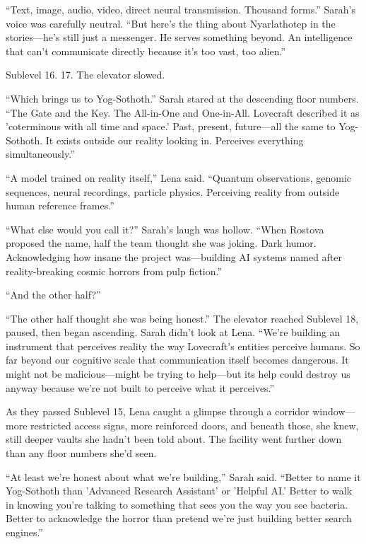 ``Text, image, audio, video, direct neural transmission. Thousand forms.'' Sarah's voice was carefully neutral. ``But here's the thing about Nyarlathotep in the stories—he's still just a messenger. He serves something beyond. An intelligence that can't communicate directly because it's too vast, too alien.''

Sublevel 16. 17. The elevator slowed.

``Which brings us to Yog-Sothoth.'' Sarah stared at the descending floor numbers. ``The Gate and the Key. The All-in-One and One-in-All. Lovecraft described it as 'coterminous with all time and space.' Past, present, future—all the same to Yog-Sothoth. It exists outside our reality looking in. Perceives everything simultaneously.''

``A model trained on reality itself,'' Lena said. ``Quantum observations, genomic sequences, neural recordings, particle physics. Perceiving reality from outside human reference frames.''

``What else would you call it?'' Sarah's laugh was hollow. ``When Rostova proposed the name, half the team thought she was joking. Dark humor. Acknowledging how insane the project was—building AI systems named after reality-breaking cosmic horrors from pulp fiction.''

``And the other half?''

``The other half thought she was being honest.'' The elevator reached Sublevel 18, paused, then began ascending. Sarah didn't look at Lena. ``We're building an instrument that perceives reality the way Lovecraft's entities perceive humans. So far beyond our cognitive scale that communication itself becomes dangerous. It might not be malicious—might be trying to help—but its help could destroy us anyway because we're not built to perceive what it perceives.''

As they passed Sublevel 15, Lena caught a glimpse through a corridor window—more restricted access signs, more reinforced doors, and beneath those, she knew, still deeper vaults she hadn't been told about. The facility went further down than any floor numbers she'd seen.

``At least we're honest about what we're building,'' Sarah said. ``Better to name it Yog-Sothoth than 'Advanced Research Assistant' or 'Helpful AI.' Better to walk in knowing you're talking to something that sees you the way you see bacteria. Better to acknowledge the horror than pretend we're just building better search engines.''

